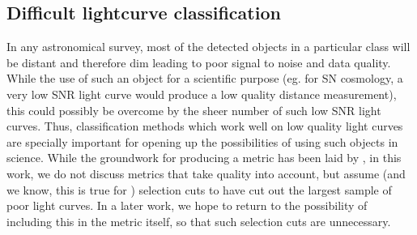 \subsection{Difficult lightcurve classification}
\label{sec:difficult}

In any astronomical survey, most of the detected objects in a particular class will be distant and therefore dim leading to poor signal to noise and data quality.
While the use of such an object for a scientific purpose (eg. for SN cosmology, a very low SNR light curve would produce a low quality distance measurement), this could possibly be overcome by the sheer number of such low SNR light curves.
Thus, classification methods which
work well on low quality light curves are specially important for opening up the possibilities of using such objects in science.
While the groundwork for producing a metric has been laid by \citet{wu_radio_2018}, in this work, we do not discuss metrics that take quality into account, but assume (and we know, this is true for \plasticc) selection cuts to have cut out the largest sample of poor light curves.
In a later work, we hope to return to the possibility of including this in the metric itself, so that such selection cuts are unnecessary.
